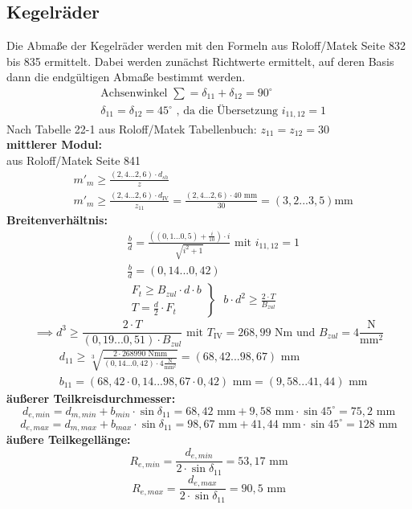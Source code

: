 \subsection{Kegelräder}
Die Abmaße der Kegelräder werden mit den Formeln aus Roloff/Matek Seite 832 bis 835 ermittelt. Dabei werden zunächst Richtwerte ermittelt, auf deren Basis dann die endgültigen Abmaße bestimmt werden.
\begin{align*}
	&\text{Achsenwinkel } \sum = \delta_{11} + \delta_{12} = 90^\circ \\
	&\delta_{11}= \delta_{12} =  45^\circ \text{ , da die Übersetzung } i_{11,12} =1
\end{align*}
Nach Tabelle 22-1 aus Roloff/Matek Tabellenbuch: $z_{11} = z_{12} = 30$ \\
\textbf{mittlerer Modul:}\\
aus Roloff/Matek Seite 841
\begin{align*}
	&m'_m \ge \frac{\left(2,4...2,6\right) \cdot d_{sh}}{z} \\
	&m'_m \ge \frac{\left(2,4...2,6\right) \cdot d_{\mathrm{IV}}}{z_{11}} = \frac{\left(2,4...2,6\right) \cdot 40\text{ mm}}{30} = (3,2...3,5) \text{mm} 
\end{align*}
\textbf{Breitenverhältnis:}
\begin{align*}
	&\frac{b}{d} = \frac{\left((0,1...0,5)+ \frac{i}{10}\right) \cdot i}{\sqrt{i^2 + 1}} \text{ mit } i_{11,12} = 1 \\
	&\frac{b}{d} = (0,14...0,42) \\
	&\left. \begin{array}{c} F_t \ge B_{zul} \cdot d \cdot b\\T = \frac{d}{2} \cdot F_t \end{array} \right\} \text{ }b \cdot d^2 \ge \frac{2 \cdot T}{B_{zul}} 
\end{align*}
\[
\implies d^3 \ge \frac{2 \cdot T}{(0,19...0,51) \cdot B_{zul}} \text{ mit } T_{\mathrm{IV}} = 268,99 \text{ Nm und  } B_{zul} = 4 \frac{\text{N}}{\text{mm}^2}
\]
\begin{align*}
	&d_{11} \ge \sqrt[3]{\frac{2 \cdot 268990 \text{ Nmm}}{(0,14...0,42) \cdot  4 \frac{\text{N}}{\text{mm}^2}}}= (68,42...98,67) \text{ mm} \\
	&b_{11} = (68,42 \cdot 0,14 ...98,67 \cdot 0,42) \text{ mm} = (9,58...41,44) \text{ mm}
\end{align*}
\textbf{äußerer Teilkreisdurchmesser:}
\[
d_{e,min} = d_{m,min} + b_{min}\cdot\sin\delta_{11} = 68,42 \text{ mm} + 9,58 \text{ mm} \cdot \sin 45^\circ =75,2 \text{ mm}
\]
\[
d_{e,max} = d_{m,max} + b_{max}\cdot\sin\delta_{11} =98,67 \text{ mm} + 41,44 \text{ mm} \cdot \sin 45^\circ =128 \text{ mm}
\]
\textbf{äußere Teilkegellänge:}
\[
R_{e,min} = \frac{d_{e,min}}{2 \cdot \sin \delta_{11}} = 53,17 \text{ mm}
\]
\[
R_{e,max} = \frac{d_{e,max}}{2 \cdot \sin \delta_{11}} = 90,5 \text{ mm}
\]


